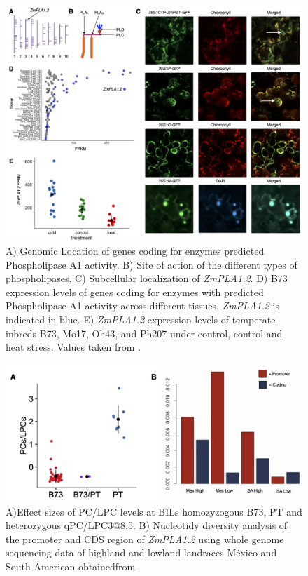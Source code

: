 \documentclass[9pt,twocolumn,twoside,lineno]{BioRxiv}
\begin{document}
\begin{figure}[t]
\begin{center}
\includegraphics[width=0.8\paperwidth]{Sup_Figures/Sup_Fig_4.png}

\caption{A) Genomic Location of genes coding for enzymes predicted Phospholipase A1 activity. 
B) Site of action of the different types of phospholipases.
C) Subcellular localization of \textit{ZmPLA1.2}.
D) B73 expression levels of genes coding for enzymes with predicted Phospholipase A1 activity across different tissues. \textit{ZmPLA1.2} is indicated in blue. 
E) \textit{ZmPLA1.2} expression levels of temperate inbreds B73, Mo17, Oh43, and Ph207 under control, control and heat stress. Values taken from \cite{Waters2017-nat}. 
}
\label{SupFig3}
\end{center}
\end{figure} 

\begin{figure}[t]
\begin{center}
\includegraphics[width=0.8\paperwidth]{Sup_Figures/Sup_Fig_5.png}
\caption{A)Effect sizes of PC/LPC levels at BILs homozyzogous B73, PT and heterozygous qPC/LPC3@8.5.
B) Nucleotidy diversity analysis of the promoter and CDS region of \textit{ZmPLA1.2} using whole genome sequencing data of highland and lowland landraces México and South American obtainedfrom \cite{Wang2017-bc}
}
\label{SupFig6}
\end{center}
\end{figure} 
\end{document}
